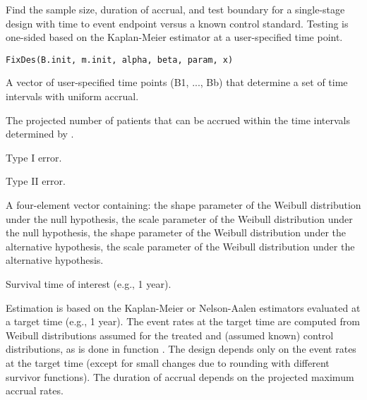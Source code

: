 \begin{Description}\relax
Find the sample size, duration of accrual, and test boundary for a single-stage
design with time to event endpoint versus a known control standard.
Testing is one-sided based on the Kaplan-Meier estimator at a
user-specified time point.
\end{Description}
\begin{Usage}
\begin{verbatim}
FixDes(B.init, m.init, alpha, beta, param, x)
\end{verbatim}
\end{Usage}
\begin{Arguments}
\begin{ldescription}
\item[\code{B.init}] A vector of user-specified time points (B1, ..., Bb) that determine a
set of time intervals with uniform accrual.
\item[\code{m.init}] The projected
number of patients that can be accrued within the time intervals determined by .
\item[\code{alpha}] Type I error.
\item[\code{beta}] Type II error.
\item[\code{param}] A four-element vector containing: the shape parameter of the Weibull distribution under the
null hypothesis, the scale parameter of the Weibull distribution under the
null hypothesis, the shape parameter of the Weibull distribution under the
alternative hypothesis, the scale parameter of the Weibull distribution under the
alternative hypothesis.
\item[\code{x}] Survival time of interest (e.g., 1 year).
\end{ldescription}
\end{Arguments}
\begin{Details}\relax
Estimation is based on the Kaplan-Meier or Nelson-Aalen estimators
evaluated at a target time (e.g., 1 year).  The event rates at the
target
time are computed from Weibull distributions assumed for the treated
and (assumed known) control distributions, as is done in function .
The design depends only on the event rates at the target time (except
for small changes due to rounding with different survivor functions).
The duration of accrual depends on the projected maximum accrual rates.
\end{Details}
